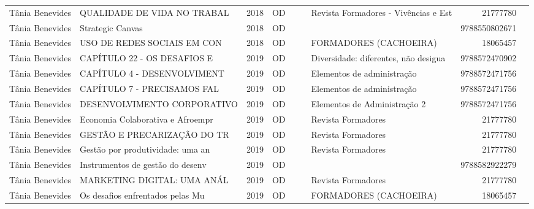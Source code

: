\documentclass[12pt,brazil]{article}\usepackage[]{graphicx}\usepackage[]{xcolor}
\begin{document}
\begin{longtable}{lllrrllrr}
Tânia Benevides & QUALIDADE DE VIDA NO TRABAL & 2018 & OD &  &  & Revista Formadores - Vivências e Est & 21777780 \\
Tânia Benevides & Strategic Canvas & 2018 & OD &  &  &  & 9788550802671 \\
Tânia Benevides & USO DE REDES SOCIAIS EM CON & 2018 & OD &  &  & FORMADORES (CACHOEIRA) & 18065457 \\
Tânia Benevides & CAPÍTULO 22 - OS DESAFIOS E & 2019 & OD &  &  & Diversidade: diferentes, não desigua & 9788572470902 \\
\rowcolor{coautr}\rowcolor{coautr}\rowcolor{coautr}\rowcolor{coautr}\rowcolor{coautr}\rowcolor{coautr}\rowcolor{coautr}\rowcolor{coautr}\rowcolor{coautr}\rowcolor{coautr}\rowcolor{coautr}\rowcolor{coautr}\rowcolor{coautr}\rowcolor{coautr}\rowcolor{coautr}\rowcolor{coautr}Tânia Benevides & CAPÍTULO 4 - DESENVOLVIMENT & 2019 & OD &  &  & Elementos de administração & 9788572471756 \\
\rowcolor{coautr}\rowcolor{coautr}\rowcolor{coautr}\rowcolor{coautr}\rowcolor{coautr}\rowcolor{coautr}\rowcolor{coautr}\rowcolor{coautr}\rowcolor{coautr}\rowcolor{coautr}\rowcolor{coautr}\rowcolor{coautr}\rowcolor{coautr}\rowcolor{coautr}\rowcolor{coautr}\rowcolor{coautr}Tânia Benevides & CAPÍTULO 7 - PRECISAMOS FAL & 2019 & OD &  &  & Elementos de administração & 9788572471756 \\
\rowcolor{coautr}\rowcolor{coautr}\rowcolor{coautr}\rowcolor{coautr}\rowcolor{coautr}\rowcolor{coautr}\rowcolor{coautr}\rowcolor{coautr}\rowcolor{coautr}\rowcolor{coautr}\rowcolor{coautr}\rowcolor{coautr}\rowcolor{coautr}\rowcolor{coautr}\rowcolor{coautr}\rowcolor{coautr}Tânia Benevides & DESENVOLVIMENTO CORPORATIVO & 2019 & OD &  &  & Elementos de Administração 2 & 9788572471756 \\
Tânia Benevides & Economia Colaborativa e Afroempr & 2019 & OD &  &  & Revista Formadores & 21777780 \\
Tânia Benevides & GESTÃO E PRECARIZAÇÃO DO TR & 2019 & OD &  &  & Revista Formadores & 21777780 \\
Tânia Benevides & Gestão por produtividade: uma an & 2019 & OD &  &  & Revista Formadores & 21777780 \\
Tânia Benevides & Instrumentos de gestão do desenv & 2019 & OD &  &  &  & 9788582922279 \\
Tânia Benevides & MARKETING DIGITAL: UMA ANÁL & 2019 & OD &  &  & Revista Formadores & 21777780 \\
Tânia Benevides & Os desafios enfrentados pelas Mu & 2019 & OD &  &  & FORMADORES (CACHOEIRA) & 18065457 \\

\end{longtable}
\end{document}
